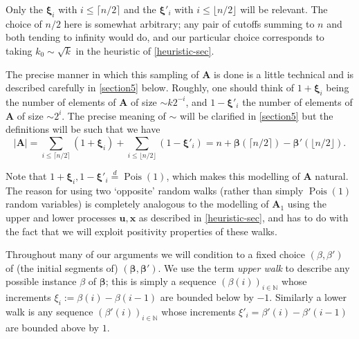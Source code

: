 \documentclass[11pt,reqno]{amsart}
\numberwithin{equation}{section}
\theoremstyle{definition}
\theoremstyle{remark}
\newcommand{\mbf}{\mathbf}
\newcommand\Pois{\operatorname{Pois}}
\def\boldbeta{\boldsymbol\beta}
\def\boldxi{\boldsymbol\xi}
\renewcommand{\le}{\leqslant}
\newcommand\N{\mathbb{N}}
\newcommand\samedist{\overset{d}{=}}
\begin{document}
Only the $\boldxi_i$ with $i \le \lceil n/2\rceil$ and the $\boldxi'_i$ with $i \le \lfloor n/2\rfloor$ will be relevant. The choice of $n/2$ here is somewhat arbitrary; any pair of cutoffs summing to $n$ and both tending to infinity would do, and our particular choice corresponds to taking $k_0 \sim \sqrt{k}$ in the heuristic of \cref{heuristic-sec}.

The precise manner in which this sampling of $\mbf{A}$ is done is a little technical and is described carefully in \cref{section5} below. Roughly, one should think of $1 + \boldxi_i$ being the number of elements of $\mbf{A}$ of size $\sim k 2^{-i}$, and $1 - \boldxi'_i$ the number of elements of $\mbf{A}$ of size $\sim 2^i$. The precise meaning of $\sim$ will be clarified in \cref{section5} but the definitions will be such that we have
\begin{equation} |\mbf{A} |  = \sum_{i \le \lceil n/2\rceil}(1 + \boldxi_i) + \sum_{i \le \lfloor n/2\rfloor} (1 - \boldxi'_i)  = n + \boldbeta(\lceil n/2\rceil) - \boldbeta'(\lfloor n/2\rfloor).\label{a-discrep}\end{equation}


Note that $1 + \boldxi_i, 1 - \boldxi'_i \samedist \Pois(1)$, which makes this modelling of $\mbf{A}$ natural. The reason for using two `opposite' random walks (rather than simply $\Pois(1)$ random variables) is completely analogous to the modelling of $\mbf{A}_1$ using the upper and lower processes $\mbf{u},\mbf{x}$ as described in \cref{heuristic-sec}, and has to do with the fact that we will exploit positivity properties of these walks.

Throughout many of our arguments we will condition to a fixed choice $(\beta, \beta')$ of (the initial segments of) $(\boldbeta, \boldbeta')$. We use the term \emph{upper walk} to describe any possible instance $\beta$ of $\boldbeta$; this is simply a sequence $(\beta(i))_{i \in \N}$ whose increments $\xi_i := \beta(i) - \beta(i-1)$ are bounded below by $-1$. Similarly a lower walk is any sequence $(\beta'(i))_{i \in \N}$ whose increments $\xi'_i = \beta'(i) - \beta'(i-1)$ are bounded above by $1$.
\end{document}
